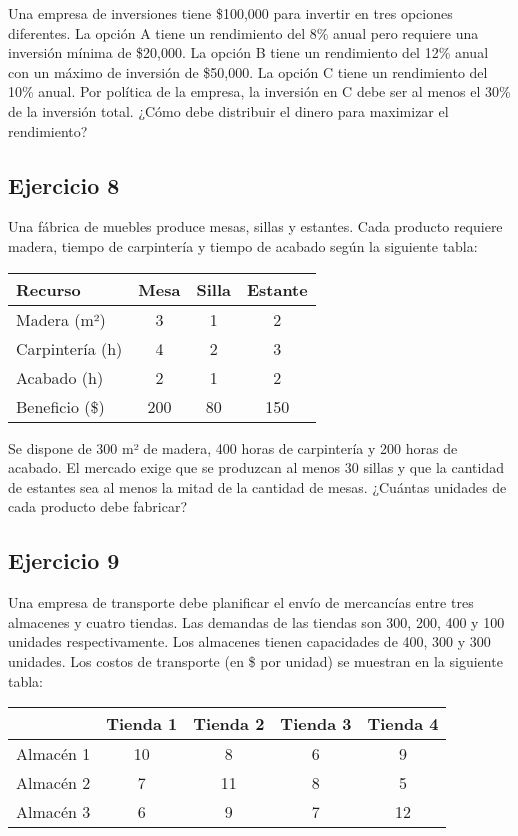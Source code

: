 \documentclass[12pt]{article}
\begin{document}
Una empresa de inversiones tiene \$100,000 para invertir en tres opciones diferentes. La opción A tiene un rendimiento del 8\% anual pero requiere una inversión mínima de \$20,000. La opción B tiene un rendimiento del 12\% anual con un máximo de inversión de \$50,000. La opción C tiene un rendimiento del 10\% anual. Por política de la empresa, la inversión en C debe ser al menos el 30\% de la inversión total. ¿Cómo debe distribuir el dinero para maximizar el rendimiento?

\subsection{Ejercicio 8}

Una fábrica de muebles produce mesas, sillas y estantes. Cada producto requiere madera, tiempo de carpintería y tiempo de acabado según la siguiente tabla:

\begin{center}
\begin{tabular}{lccc}
\toprule
Recurso & Mesa & Silla & Estante \\
\midrule
Madera (m²) & 3 & 1 & 2 \\
Carpintería (h) & 4 & 2 & 3 \\
Acabado (h) & 2 & 1 & 2 \\
\midrule
Beneficio (\$) & 200 & 80 & 150 \\
\bottomrule
\end{tabular}
\end{center}

Se dispone de 300 m² de madera, 400 horas de carpintería y 200 horas de acabado. El mercado exige que se produzcan al menos 30 sillas y que la cantidad de estantes sea al menos la mitad de la cantidad de mesas. ¿Cuántas unidades de cada producto debe fabricar?

\subsection{Ejercicio 9}

Una empresa de transporte debe planificar el envío de mercancías entre tres almacenes y cuatro tiendas. Las demandas de las tiendas son 300, 200, 400 y 100 unidades respectivamente. Los almacenes tienen capacidades de 400, 300 y 300 unidades. Los costos de transporte (en \$ por unidad) se muestran en la siguiente tabla:

\begin{center}
\begin{tabular}{lcccc}
\toprule
& Tienda 1 & Tienda 2 & Tienda 3 & Tienda 4 \\
\midrule
Almacén 1 & 10 & 8 & 6 & 9 \\
Almacén 2 & 7 & 11 & 8 & 5 \\
Almacén 3 & 6 & 9 & 7 & 12 \\
\bottomrule
\end{tabular}
\end{center}
\end{document}
